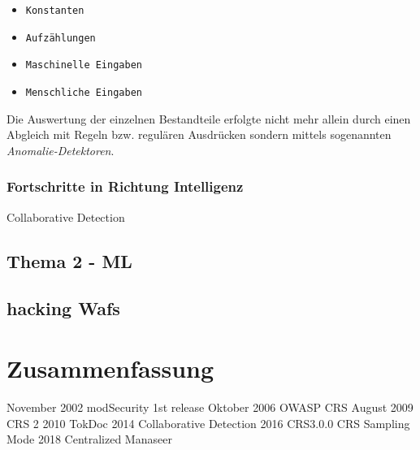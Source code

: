 \begin{itemize}
\item \verb=Konstanten= 
\item \verb=Aufzählungen=
\item \verb=Maschinelle Eingaben=
\item \verb=Menschliche Eingaben=
\end{itemize}

Die Auswertung der einzelnen Bestandteile erfolgte nicht mehr allein durch einen Abgleich mit Regeln bzw. regulären Ausdrücken sondern mittels sogenannten \emph{Anomalie-Detektoren}. 


\subsubsection{Fortschritte in Richtung Intelligenz}

Collaborative Detection \cite{karakannas2014}


\subsection{Thema 2 - ML}


\subsection{hacking Wafs}


\section{Zusammenfassung}



November 2002 modSecurity 1st release
Oktober 2006 OWASP CRS
August 2009 CRS 2
2010 TokDoc
2014 Collaborative Detection
2016 CRS3.0.0 CRS Sampling Mode
2018 Centralized Manaseer